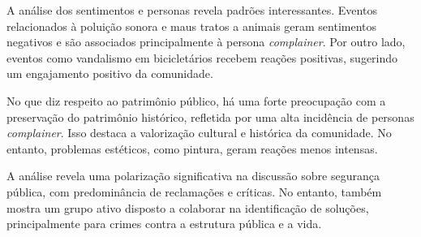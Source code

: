 A análise dos sentimentos e personas revela padrões interessantes. Eventos relacionados à poluição sonora e maus tratos a animais geram sentimentos negativos e são associados principalmente à persona \textit{complainer}. Por outro lado, eventos como vandalismo em bicicletários recebem reações positivas, sugerindo um engajamento positivo da comunidade.

No que diz respeito ao patrimônio público, há uma forte preocupação com a preservação do patrimônio histórico, refletida por uma alta incidência de personas \textit{complainer}. Isso destaca a valorização cultural e histórica da comunidade. No entanto, problemas estéticos, como pintura, geram reações menos intensas.

A análise revela uma polarização significativa na discussão sobre segurança pública, com predominância de reclamações e críticas. No entanto, também mostra um grupo ativo disposto a colaborar na identificação de soluções, principalmente para crimes contra a estrutura pública e a vida.

